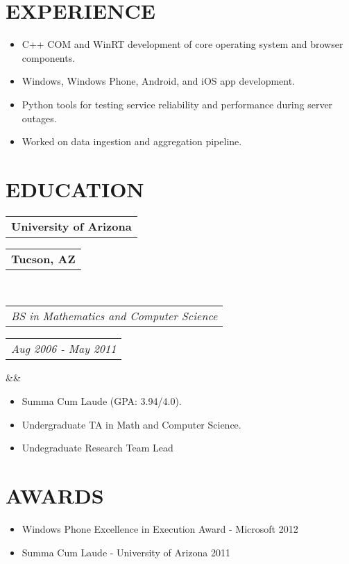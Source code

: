 \documentclass[11pt,a4paper,roman]{moderncv}
\makeatletter
\newcommand*{\customcventry}[7][.25em]{
  \begin{tabular}{@{}l} 
    {\bfseries #4}
  \end{tabular}
  \hfill %
  \begin{tabular}{l@{}}
     {\bfseries #5}
  \end{tabular} \\
  \begin{tabular}{@{}l} 
    {\itshape #3}
  \end{tabular}
  \hfill %
  \begin{tabular}{l@{}}
     {\itshape #2}
  \end{tabular}
  \ifx&#7&%
  \else{\\%
    \begin{minipage}{\maincolumnwidth}%
      \small#7%
    \end{minipage}}\fi%
  \par\addvspace{#1}}
\makeatother
\begin{document}
\section{EXPERIENCE}
{}
{\begin{itemize}
  \item C++ COM and WinRT development of core operating system and browser components.
  \item Windows, Windows Phone, Android, and iOS app development.
\end{itemize}
}

{}
{\begin{itemize}
  \item Python tools for testing service reliability and performance during server outages.
  \item Worked on data ingestion and aggregation pipeline.
\end{itemize}
}

\section{EDUCATION}
{\customcventry{Aug 2006 - May 2011}{BS in Mathematics and Computer Science}{University of Arizona}{Tucson, AZ}{}{}}
{\begin{itemize}
  \item Summa Cum Laude (GPA: 3.94/4.0).
  \item Undergraduate TA in Math and Computer Science.
  \item Undegraduate Research Team Lead
  {
  }
\end{itemize}
}


\section{AWARDS}
{\begin{itemize}
    \item Windows Phone Excellence in Execution Award - Microsoft 2012
    \item Summa Cum Laude - University of Arizona 2011
  \end{itemize}
}
\end{document}
